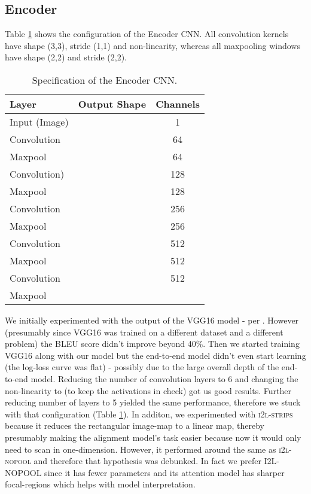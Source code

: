 \documentclass{article}
\begin{document}
\subsection{Encoder}
\label{encoder-commentary}
Table \ref{table-cnn} shows the configuration of the Encoder CNN. All convolution kernels have shape (3,3), stride (1,1) and  non-linearity, whereas all maxpooling windows have shape (2,2) and stride (2,2).
\begin{table}[!hbtp]
	\caption{Specification of the Encoder CNN.}
	\begin{tabular}{lcc}
		\hline
		{Layer} & Output Shape & {Channels} \\
		\hline
		Input (Image) &  & 1\\
		Convolution &  & 64 \\
		Maxpool &  & 64 \\
		Convolution) &  & 128 \\
		Maxpool &  & 128 \\
		Convolution &  & 256 \\
		Maxpool &  & 256 \\
		Convolution &  & 512 \\
		Maxpool &  & 512 \\
		Convolution &  & 512 \\
		Maxpool &  &  
	\end{tabular}
	\centering
	\label{table-cnn}
\end{table}
We initially experimented with the output of the VGG16 model \cite{Simonyan2014VeryDC} - per \citet{Xu2015ShowAA}. However (presumably since VGG16 was trained on a different dataset and a different problem) the BLEU score didn't improve beyond 40\%. Then we started training VGG16 along with our model but the end-to-end model didn't even start learning (the log-loss curve was flat) - possibly due to the large overall depth of the end-to-end model. Reducing the number of convolution layers to 6 and changing the non-linearity to  (to keep the activations in check) got us good results. Further reducing number of layers to 5 yielded the same performance, therefore we stuck with that configuration (Table \ref{table-cnn}). In additon, we experimented with \textsc{i2l-strips} because it reduces the rectangular image-map to a linear map, thereby presumably making the alignment model's task easier because now it would only need to scan in one-dimension. However, it performed around the same as \textsc{i2l-nopool} and therefore that hypothesis was debunked. In fact we prefer I2L-NOPOOL since it has fewer parameters and its attention model has sharper focal-regions which helps with model interpretation.
\end{document}
